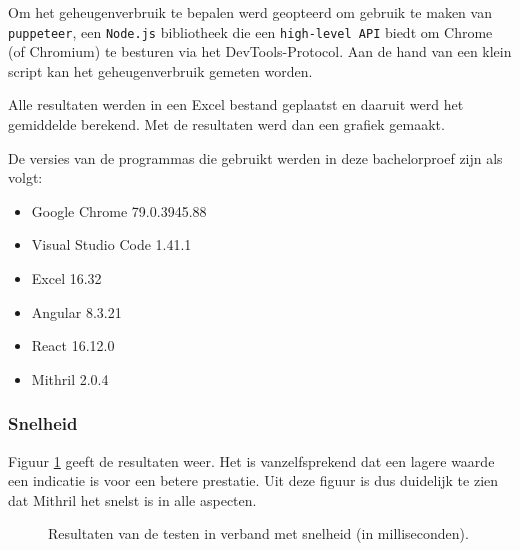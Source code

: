 Om het geheugenverbruik te bepalen werd geopteerd om gebruik te maken van \texttt{puppeteer}, een \texttt{Node.js} bibliotheek die een \texttt{high-level API} biedt om Chrome (of Chromium) te besturen via het DevTools-Protocol. Aan de hand van een klein script kan het geheugenverbruik gemeten worden.

Alle resultaten werden in een Excel bestand geplaatst en daaruit werd het gemiddelde berekend. Met de resultaten werd dan een grafiek gemaakt.

De versies van de programmas die gebruikt werden in deze bachelorproef zijn als volgt:
\begin{itemize}
    \item Google Chrome 79.0.3945.88
    \item Visual Studio Code 1.41.1
    \item Excel 16.32
    \item Angular 8.3.21
    \item React 16.12.0
    \item Mithril 2.0.4
\end{itemize}

\subsubsection{Snelheid}

Figuur \ref{fig:snelheid-resultaten} geeft de resultaten weer. Het is vanzelfsprekend dat een lagere waarde een indicatie is voor een betere prestatie. Uit deze figuur is dus duidelijk te zien dat Mithril het snelst is in alle aspecten.

\begin{figure}[!ht]
    \hfill
    \hfill
    \hfill
    \hfill
    \centering
    \caption{Resultaten van de testen in verband met snelheid (in milliseconden).}
    \label{fig:snelheid-resultaten}
\end{figure}


